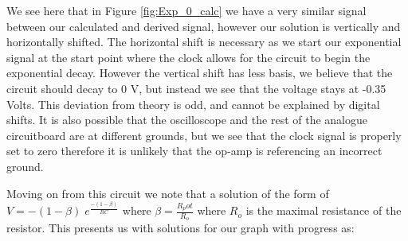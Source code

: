 We see here that in Figure \ref{fig:Exp_0_calc} we have a very similar signal between our calculated and derived signal, however our solution is vertically and horizontally shifted. The horizontal shift is necessary as we start our exponential signal at the start point where the clock allows for the circuit to begin the exponential decay. However the vertical shift has less basis, we believe that the circuit should decay to 0 V, but instead we see that the voltage stays at -0.35 Volts. This deviation from theory is odd, and cannot be explained by digital shifts. It is also possible that the oscilloscope and the rest of the analogue circuitboard are at different grounds, but we see that the clock signal is properly set to zero therefore it is unlikely that the op-amp is referencing an incorrect ground. \newline

Moving on from this circuit we note that a solution of the form of $V = -(1 - \beta) \; e^{\frac{-(1 - \beta)}{RC}}$ where $\beta = \frac{R_pot}{R_o}$ where $R_o$ is the maximal resistance of the resistor. This presents us with solutions for our graph with progress as:

